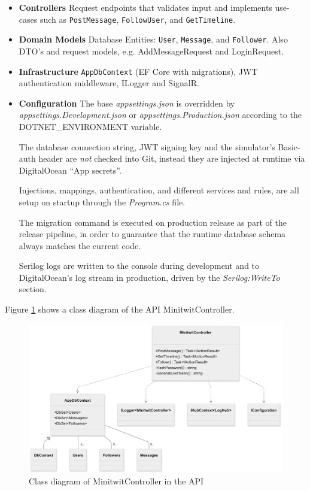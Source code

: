 \begin{itemize}
  \item \textbf{Controllers}  
        Request endpoints that validates input and implements use-cases such as
        \lstinline{PostMessage}, \lstinline{FollowUser}, and
        \lstinline{GetTimeline}.
  \item \textbf{Domain Models}  
        Database Entities: \lstinline{User}, \lstinline{Message}, and
        \lstinline{Follower}. Also DTO's and request models, e.g. AddMessageRequest and LoginRequest.
  \item \textbf{Infrastructure}  
        \lstinline{AppDbContext} (EF Core with migrations), JWT authentication middleware, ILogger and SignalR.
  \item \textbf{Configuration}
The base \textit{appsettings.json} is overridden by \textit{appsettings.Development.json} or \textit{appsettings.Production.json} according to the DOTNET\_ENVIRONMENT variable.

The database connection string, JWT signing key and the simulator’s Basic-auth header are \emph{not} checked into Git, instead they are injected at runtime via DigitalOcean “App secrets”.

Injections, mappings, authentication, and different services and rules, are all setup on startup through the \textit{Program.cs} file. 

The migration command is executed on production release as part of the release pipeline, in order to guarantee that the runtime database schema always matches the current code.

Serilog logs are written to the console during development and to DigitalOcean’s log stream in production, driven by the \textit{Serilog:WriteTo} section.
\end{itemize}

Figure \ref{fig:apicontrollerclass} shows a class diagram of the API MinitwitController.

\begin{figure}[H]
    \centering
    \includegraphics[width=1\linewidth]{images/APIClass2.png}
    \caption{Class diagram of MinitwitController in the API}
    \label{fig:apicontrollerclass}
\end{figure}

